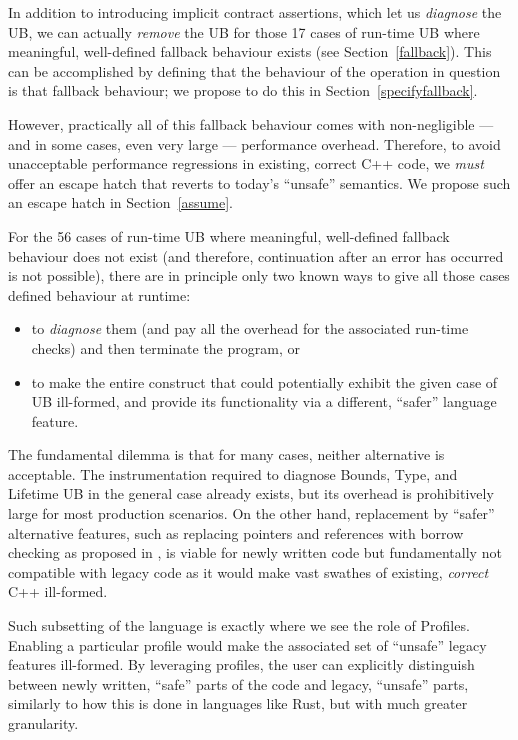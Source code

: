 In addition to introducing implicit contract assertions, which let us \emph{diagnose} the UB, we can actually \emph{remove} the UB for those 17 cases of run-time UB where meaningful, well-defined fallback behaviour exists (see Section~\ref{fallback}). This can be accomplished by defining that the behaviour of the operation in question is that fallback behaviour; we propose to do this in Section~\ref{specifyfallback}.

However, practically all of this fallback behaviour comes with non-negligible --- and in some cases, even very large --- performance overhead. Therefore, to avoid unacceptable performance regressions in existing, correct C++ code, we \emph{must} offer an escape hatch that reverts to today's ``unsafe'' semantics. We propose such an escape hatch in Section~\ref{assume}.

For the 56 cases of run-time UB where meaningful, well-defined fallback behaviour does not exist (and therefore, continuation after an error has occurred is not possible), there are in principle only two known ways to give all those cases defined behaviour at runtime:
\begin{itemize}
\item to \emph{diagnose} them (and pay all the overhead for the associated run-time checks) and then terminate the program, or
\item to make the entire construct that could potentially exhibit the given case of UB ill-formed, and provide its functionality via a different, ``safer'' language feature.
\end{itemize}

The fundamental dilemma is that for many cases, neither alternative is acceptable. The instrumentation required to diagnose Bounds, Type, and Lifetime UB in the general case already exists, but its overhead is prohibitively large for most production scenarios. On the other hand, replacement by ``safer'' alternative features, such as replacing pointers and references with borrow checking as proposed in \cite{P3390R0}, is viable for newly written code but fundamentally not compatible with legacy code as it would make vast swathes of existing, \emph{correct} C++ ill-formed.

Such subsetting of the language is exactly where we see the role of Profiles. Enabling a particular profile would make the associated set of ``unsafe'' legacy features ill-formed. By leveraging profiles, the user can explicitly distinguish between newly written, ``safe'' parts of the code and legacy, ``unsafe'' parts, similarly to how this is done in languages like Rust, but with much greater granularity.

